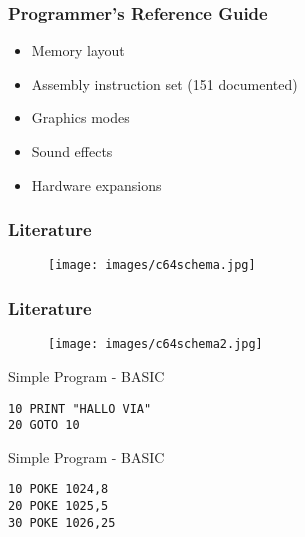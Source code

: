 \documentclass[aspectratio=43]{uva-inf-presentation}
\begin{document}

\begin{frame}
\frametitle{Programmer's Reference Guide}

\begin{itemize}
\item Memory layout
\item Assembly instruction set (151 documented)
\item Graphics modes
\item Sound effects
\item Hardware expansions
\end{itemize}

\end{frame}


\begin{frame}
\frametitle{Literature}

\begin{figure}
\texttt{[image: images/c64schema.jpg]}
\end{figure}

\end{frame}


\begin{frame}
\frametitle{Literature}

\begin{figure}
\texttt{[image: images/c64schema2.jpg]}
\end{figure}

\end{frame}


\begin{frame}[fragile]{Simple Program - BASIC}

\begin{lstlisting}
10 PRINT "HALLO VIA"
20 GOTO 10
\end{lstlisting}

\end{frame}


\begin{frame}[fragile]{Simple Program - BASIC}

\begin{lstlisting}
10 POKE 1024,8
20 POKE 1025,5
30 POKE 1026,25
\end{lstlisting}

\end{frame}
\end{document}
